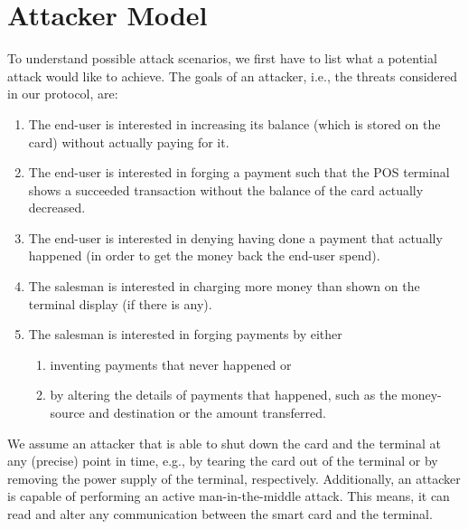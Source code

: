 \section{Attacker Model}\label{attackerModel}
To understand possible attack scenarios, we first have to list what a potential attack would like to achieve.
The goals of an attacker, i.e., the threats considered in our protocol, are:
\begin{enumerate}[label={T\arabic*:}, leftmargin=2\parindent, ref={T\arabic*}]
    \item \label{threat:increaseWithoutPaying}
    The end-user is interested in increasing its balance (which is stored on the card) without actually paying for it.
    \item \label{threat:payWithoutDecrease}
    The end-user is interested in forging a payment such that the POS terminal shows a succeeded transaction without the balance of the card actually decreased.
    \item \label{threat:denyPayment}
    The end-user is interested in denying having done a payment that actually happened (in order to get the money back the end-user spend).
    \item \label{threat:chargeMoreThanDisplayed}
    The salesman is interested in charging more money than shown on the terminal display (if there is any).
    \item The salesman is interested in forging payments by either 
    \begin{enumerate}[ref={\theenumi~\alph*}]
        \item \label{threat:inventNewPayments}
        inventing payments that never happened or
        \item \label{threat:alterPaymentDetails}
        by altering the details of payments that happened, such as the money-source and destination or the amount transferred.
    \end{enumerate}
\end{enumerate}

We assume an attacker that is able to shut down the card and the terminal at any (precise) point in time, e.g., by tearing the card out of the terminal or by removing the power supply of the terminal, respectively.
Additionally, an attacker is capable of performing an active man-in-the-middle attack.
This means, it can read and alter any communication between the smart card and the terminal.


